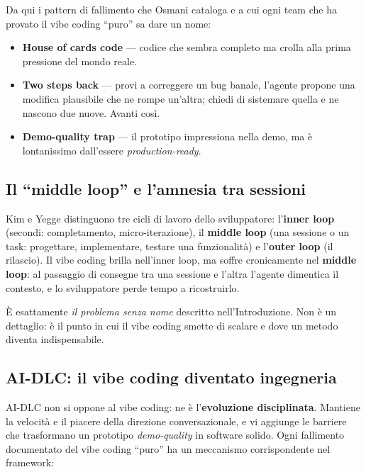 Da qui i pattern di fallimento che Osmani cataloga e a cui ogni team che ha provato il vibe coding ``puro'' sa dare un nome:

\begin{itemize}
  \item \textbf{House of cards code} --- codice che sembra completo ma crolla alla prima pressione del mondo reale.
  \item \textbf{Two steps back} --- provi a correggere un bug banale, l'agente propone una modifica plausibile che ne rompe un'altra; chiedi di sistemare quella e ne nascono due nuove. Avanti così.
  \item \textbf{Demo-quality trap} --- il prototipo impressiona nella demo, ma è lontanissimo dall'essere \textit{production-ready}.
\end{itemize}

\subsection*{Il ``middle loop'' e l'amnesia tra sessioni}

Kim e Yegge distinguono tre cicli di lavoro dello sviluppatore: l'\textbf{inner loop} (secondi: completamento, micro-iterazione), il \textbf{middle loop} (una sessione o un task: progettare, implementare, testare una funzionalità) e l'\textbf{outer loop} (il rilascio). Il vibe coding brilla nell'inner loop, ma soffre cronicamente nel \textbf{middle loop}: al passaggio di consegne tra una sessione e l'altra l'agente dimentica il contesto, e lo sviluppatore perde tempo a ricostruirlo.

È esattamente \textit{il problema senza nome} descritto nell'Introduzione. Non è un dettaglio: è il punto in cui il vibe coding smette di scalare e dove un metodo diventa indispensabile.

\subsection*{AI-DLC: il vibe coding diventato ingegneria}

AI-DLC non si oppone al vibe coding: ne è l'\textbf{evoluzione disciplinata}. Mantiene la velocità e il piacere della direzione conversazionale, e vi aggiunge le barriere che trasformano un prototipo \textit{demo-quality} in software solido. Ogni fallimento documentato del vibe coding ``puro'' ha un meccanismo corrispondente nel framework:

